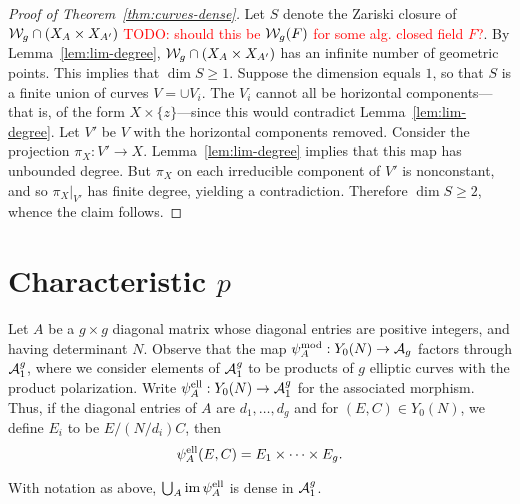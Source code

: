 \documentclass{amsart}
\begin{document}
\begin{proof}[Proof of Theorem~\ref{thm:curves-dense}]
  Let $S$ denote the Zariski closure of $\mathcal{W}_g \cap (X_A \times X_{A'})$ \textcolor{red}{TODO: should this be $\mathcal{W}_g(F)$ for some alg. closed field $F$?}. By Lemma~\ref{lem:lim-degree}, $\mathcal{W}_g \cap (X_A \times X_{A'})$ has an infinite number of geometric points. This implies that $\dim S \geq 1$. Suppose the dimension equals $1$, so that $S$ is a finite union of curves $V = \cup V_i$. The $V_i$ cannot all be horizontal components---that is, of the form $X \times \{z\}$---since this would contradict Lemma~\ref{lem:lim-degree}. Let $V'$ be $V$ with the horizontal components removed. Consider the projection $\pi_X: V' \to X$. Lemma~\ref{lem:lim-degree} implies that this map has unbounded degree. But $\pi_X$ on each irreducible component of $V'$ is nonconstant, and so $\pi_X|_{V'}$ has finite degree, yielding a contradiction. Therefore $\dim S \geq 2$, whence the claim follows.
\end{proof}







\section{Characteristic $p$}
\label{sec:characteristic-p}

Let $A$ be a $g \times g$ diagonal matrix whose diagonal entries are positive integers, and having determinant $N$. Observe that the map $\psi_{A}^\mathrm{mod}: Y_0(N) \to \mathcal{A}_g$ factors through $\mathcal{A}_1^g$, where we consider elements of $\mathcal{A}_1^g$ to be products of $g$ elliptic curves with the product polarization. Write $\psi_{A}^\mathrm{ell}: Y_0(N) \to \mathcal{A}_1^g$ for the associated morphism. Thus, if the diagonal entries of $A$ are $d_1, \ldots, d_g$ and for $(E, C) \in Y_0(N)$, we define $E_i$ to be $E/(N/d_i)C$, then
\[
  \psi_{A}^\mathrm{ell}(E,C) = E_1 \times \cdots \times E_g.
\]

\begin{theorem}
  With notation as above,  $\bigcup_A \operatorname{im}\psi_{A}^\mathrm{ell}$ is dense in $\mathcal{A}_1^g$.
\end{theorem}
\end{document}
